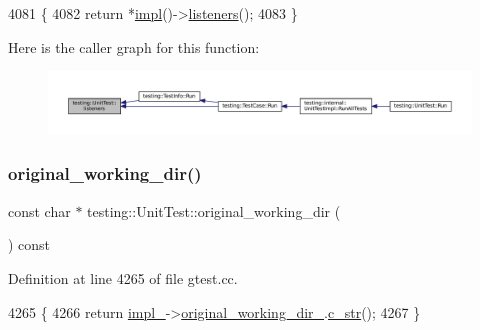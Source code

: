 \begin{DoxyCode}
4081                                         \{
4082   \textcolor{keywordflow}{return} *\hyperlink{classtesting_1_1UnitTest_a4df5d11a58affb337d7fa62eaa07690e}{impl}()->\hyperlink{classtesting_1_1internal_1_1UnitTestImpl_a67211f8475936f88d0e4d30f841c0da4}{listeners}();
4083 \}
\end{DoxyCode}
Here is the caller graph for this function\+:
\nopagebreak
\begin{figure}[H]
\begin{center}
\leavevmode
\includegraphics[width=350pt]{classtesting_1_1UnitTest_aac10085cf7c0d1751306db10cdd953cb_icgraph}
\end{center}
\end{figure}
\mbox{\label{classtesting_1_1UnitTest_af6809b7747785c80f7a2f31f6b39b152}} 
\subsubsection{\texorpdfstring{original\+\_\+working\+\_\+dir()}{original\_working\_dir()}}
{\footnotesize\ttfamily const char $\ast$ testing\+::\+Unit\+Test\+::original\+\_\+working\+\_\+dir (\begin{DoxyParamCaption}{ }\end{DoxyParamCaption}) const}



Definition at line 4265 of file gtest.\+cc.


\begin{DoxyCode}
4265                                                  \{
4266   \textcolor{keywordflow}{return} \hyperlink{classtesting_1_1UnitTest_a834685f92009d21b21a7307f4cbfb6e5}{impl\_}->\hyperlink{classtesting_1_1internal_1_1UnitTestImpl_aaf1f1d4cbb2f681ded9bbf4c6075430c}{original\_working\_dir\_}.\hyperlink{classtesting_1_1internal_1_1FilePath_a43e9ff978b0d7c43c401d976d4621aa3}{c\_str}();
4267 \}
\end{DoxyCode}
\mbox{\label{classtesting_1_1UnitTest_a7c9b327bc14cb8a282c789dc6513a55b}} 
